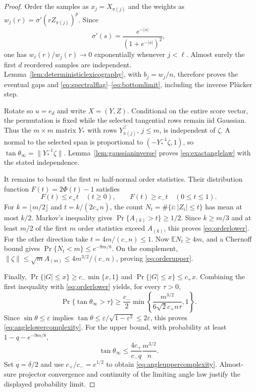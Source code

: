 \documentclass[11pt]{article}
\newcommand{\E}{\mathbb E}
\begin{document}
\begin{proof}
Order the samples as $x_j=X_{\pi(j)}$ and the weights as $w_j(r)=\sigma'(rZ_{\pi(j)})^p$.  Since
\[
 \sigma'(s)=\frac{e^{-|s|}}{(1+e^{-|s|})^2},
\]
one has $w_\ell(r)/w_j(r)\to0$ exponentially whenever $j<\ell$.  Almost surely the first $d$ reordered samples
are independent.  Lemma~\ref{lem:deterministiclexicography}, with $b_j=w_j/n$, therefore proves the eventual
gaps and \eqref{eq:spectralflag}--\eqref{eq:bottomlimit}, including the inverse Pl\"ucker step.

Rotate so $u=e_d$ and write $X=(Y,Z)$.  Conditional on the entire score vector, the permutation is fixed while
the selected tangential rows remain iid Gaussian.  Thus the $m\times m$ matrix $Y_*$ with rows
$Y_{\pi(j)}^\top$, $j\le m$, is independent of $\zeta$.  A normal to the selected span is proportional to
$(-Y_*^{-1}\zeta,1)$, so $\tan\theta_\infty=\lVert Y_*^{-1}\zeta\rVert$.
Lemma~\ref{lem:gaussianinverse} proves \eqref{eq:exactanglelaw} with the stated independence.

It remains to bound the first $m$ half-normal order statistics.  Their distribution function
$F(t)=2\Phi(t)-1$ satisfies
\begin{equation}
 F(t)\le c_+t\quad(t\ge0),
 \qquad
 F(t)\ge c_-t\quad(0\le t\le1).
 \label{eq:halfnormalbounds}
\end{equation}
For $k=\lfloor m/2\rfloor$ and $t=k/(2c_+n)$, the count
$N_t=\#\{i:|Z_i|\le t\}$ has mean at most $k/2$.  Markov's inequality gives
$\Pr\{A_{(k)}>t\}\ge1/2$.  Since $k\ge m/3$ and at least $m/2$ of the first $m$ order statistics exceed
$A_{(k)}$, this proves \eqref{eq:orderlower}.  For the other direction take $t=4m/(c_-n)\le1$.
Now $\E N_t\ge4m$, and a Chernoff bound gives
$\Pr\{N_t<m\}\le e^{-9m/8}$.  On the complement,
$\lVert\zeta\rVert\le\sqrt mA_{(m)}\le4m^{3/2}/(c_-n)$, proving \eqref{eq:orderupper}.

Finally, $\Pr\{|G|\le x\}\ge c_-\min\{x,1\}$ and
$\Pr\{|G|\le x\}\le c_+x$.  Combining the first inequality with \eqref{eq:orderlower} yields, for every $\tau>0$,
\[
 \Pr\{\tan\theta_\infty>\tau\}\ge
 \frac{c_-}{2}\min\!\left\{\frac{m^{3/2}}{6\sqrt2c_+n\tau},1\right\}.
\]
Since $\sin\theta\le\varepsilon$ implies
$\tan\theta\le\varepsilon/\sqrt{1-\varepsilon^2}\le2\varepsilon$, this proves
\eqref{eq:anglelowercomplexity}.  For the upper bound, with probability at least $1-q-e^{-9m/8}$,
\[
 \tan\theta_\infty\le\frac{4c_+}{c_-q}\frac{m^{3/2}}n.
\]
Set $q=\delta/2$ and use $c_+/c_-=e^{1/2}$ to obtain \eqref{eq:angleuppercomplexity}.  Almost-sure projector
convergence and continuity of the limiting angle law justify the displayed probability limit.
\end{proof}
\end{document}
